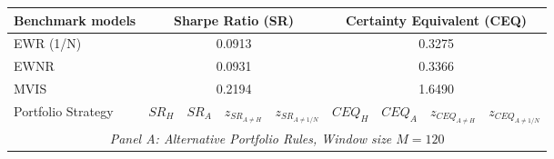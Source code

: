 \begin{tabularx}{1\textwidth}{Xcccccccc}
\toprule
Benchmark models &  \multicolumn{4}{c}{Sharpe Ratio (SR)} & \multicolumn{4}{c}{Certainty Equivalent (CEQ)}      \\
\midrule
EWR (1/N) & \multicolumn{4}{c}{0.0913} & \multicolumn{4}{c}{0.3275}  \\
EWNR & \multicolumn{4}{c}{0.0931} & \multicolumn{4}{c}{0.3366}  \\
MVIS & \multicolumn{4}{c}{0.2194} & \multicolumn{4}{c}{1.6490}  \\
\midrule
Portfolio Strategy & $SR_{H}$ & $SR_{A}$ & $z_{SR_{A \neq H}}$ & $z_{SR_{A \neq 1/N}}$ & $CEQ_{H}$ & $CEQ_{A}$ & $z_{CEQ_{A \neq H}}$ & $z_{CEQ_{A \neq 1/N}}$\\
\midrule
\multicolumn{9}{c}{\emph{Panel A: Alternative Portfolio Rules, Window size $M=120$}} \\


\end{tabularx}
